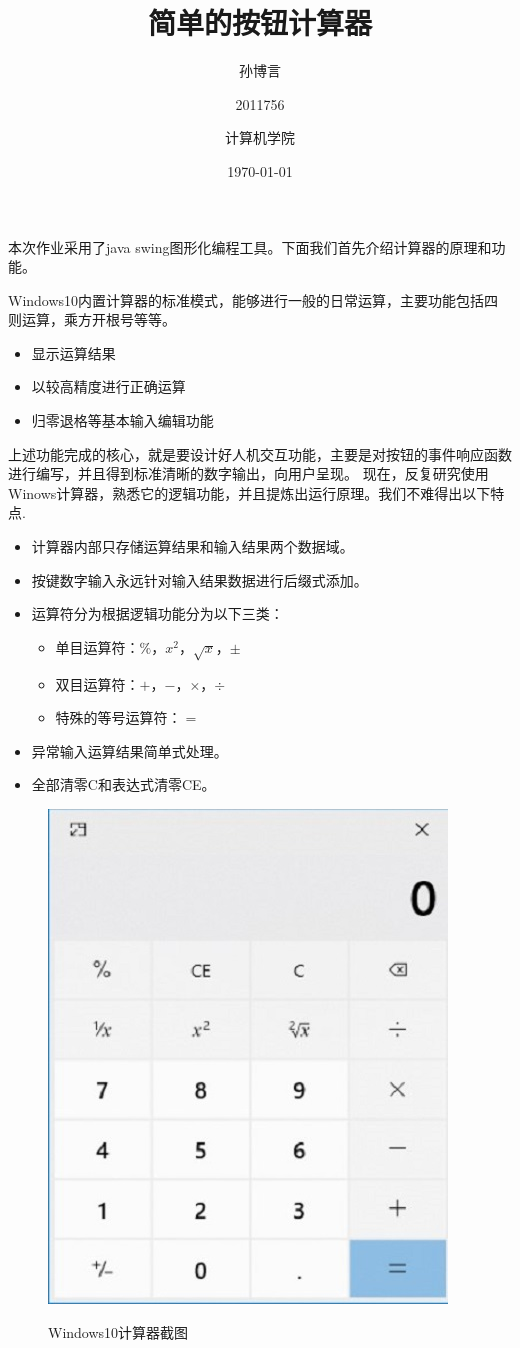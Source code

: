 \documentclass{ctexart}
\title{\heiti \zihao{2} 简单的按钮计算器}
\date{\today}
\author{孙博言 \and 2011756 \and 计算机学院}
\begin{document}
\maketitle
本次作业采用了java swing图形化编程工具。下面我们首先介绍计算器的原理和功能。

Windows10内置计算器的标准模式，能够进行一般的日常运算，主要功能包括四则运算，乘方开根号等等。
\begin{itemize}
    \item 显示运算结果
    \item 以较高精度进行正确运算
    \item 归零退格等基本输入编辑功能
\end{itemize}
上述功能完成的核心，就是要设计好人机交互功能，主要是对按钮的事件响应函数进行编写，并且得到标准清晰的数字输出，向用户呈现。
现在，反复研究使用Winows计算器，熟悉它的逻辑功能，并且提炼出运行原理。我们不难得出以下特点.
\begin{itemize}
    \item 计算器内部只存储运算结果和输入结果两个数据域。
    \item 按键数字输入永远针对输入结果数据进行后缀式添加。
    \item 运算符分为根据逻辑功能分为以下三类：
          \begin{itemize}
              \item 单目运算符：$\%$，$x^2$，$\sqrt{x}$，$\pm$
              \item 双目运算符：$+$，$-$，$\times$，$\div$
              \item 特殊的等号运算符：$=$
          \end{itemize}
    \item 异常输入运算结果简单式处理。
    \item 全部清零C和表达式清零CE。
\end{itemize}
\newpage
\begin{figure}[htbp]
    \centering
    \caption{Windows10计算器截图}
    \includegraphics{1.jpg}
    \label{fig:1}
\end{figure}
\end{document}
